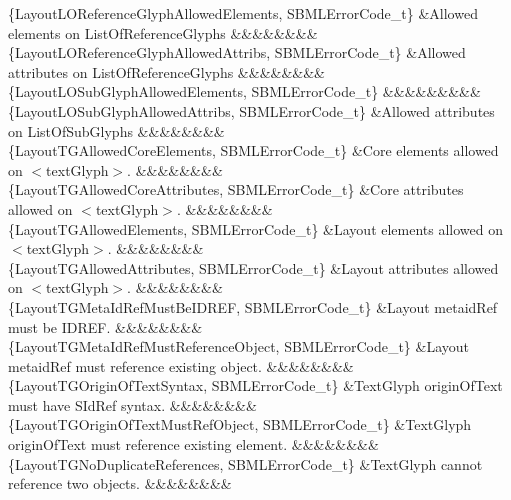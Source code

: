 \begin{DoxyParagraph}{}
\begin{longtabu}
\{Layout\+L\+O\+Reference\+Glyph\+Allowed\+Elements, S\+B\+M\+L\+Error\+Code\+\_\+t\} &Allowed elements on List\+Of\+Reference\+Glyphs &&&&&&&&\\
\{Layout\+L\+O\+Reference\+Glyph\+Allowed\+Attribs, S\+B\+M\+L\+Error\+Code\+\_\+t\} &Allowed attributes on List\+Of\+Reference\+Glyphs &&&&&&&&\\
\{Layout\+L\+O\+Sub\+Glyph\+Allowed\+Elements, S\+B\+M\+L\+Error\+Code\+\_\+t\} &&&&&&&&&\\
\{Layout\+L\+O\+Sub\+Glyph\+Allowed\+Attribs, S\+B\+M\+L\+Error\+Code\+\_\+t\} &Allowed attributes on List\+Of\+Sub\+Glyphs &&&&&&&&\\
\{Layout\+T\+G\+Allowed\+Core\+Elements, S\+B\+M\+L\+Error\+Code\+\_\+t\} &Core elements allowed on {\ttfamily $<$text\+Glyph$>$}. &&&&&&&&\\
\{Layout\+T\+G\+Allowed\+Core\+Attributes, S\+B\+M\+L\+Error\+Code\+\_\+t\} &Core attributes allowed on {\ttfamily $<$text\+Glyph$>$}. &&&&&&&&\\
\{Layout\+T\+G\+Allowed\+Elements, S\+B\+M\+L\+Error\+Code\+\_\+t\} &Layout elements allowed on {\ttfamily $<$text\+Glyph$>$}. &&&&&&&&\\
\{Layout\+T\+G\+Allowed\+Attributes, S\+B\+M\+L\+Error\+Code\+\_\+t\} &Layout attributes allowed on {\ttfamily $<$text\+Glyph$>$}. &&&&&&&&\\
\{Layout\+T\+G\+Meta\+Id\+Ref\+Must\+Be\+I\+D\+R\+EF, S\+B\+M\+L\+Error\+Code\+\_\+t\} &Layout \textquotesingle{}metaid\+Ref\textquotesingle{} must be I\+D\+R\+EF. &&&&&&&&\\
\{Layout\+T\+G\+Meta\+Id\+Ref\+Must\+Reference\+Object, S\+B\+M\+L\+Error\+Code\+\_\+t\} &Layout \textquotesingle{}metaid\+Ref\textquotesingle{} must reference existing object. &&&&&&&&\\
\{Layout\+T\+G\+Origin\+Of\+Text\+Syntax, S\+B\+M\+L\+Error\+Code\+\_\+t\} &Text\+Glyph \textquotesingle{}origin\+Of\+Text\textquotesingle{} must have S\+Id\+Ref syntax. &&&&&&&&\\
\{Layout\+T\+G\+Origin\+Of\+Text\+Must\+Ref\+Object, S\+B\+M\+L\+Error\+Code\+\_\+t\} &Text\+Glyph \textquotesingle{}origin\+Of\+Text\textquotesingle{} must reference existing element. &&&&&&&&\\
\{Layout\+T\+G\+No\+Duplicate\+References, S\+B\+M\+L\+Error\+Code\+\_\+t\} &Text\+Glyph cannot reference two objects. &&&&&&&&\\

\end{longtabu}
\end{DoxyParagraph}
